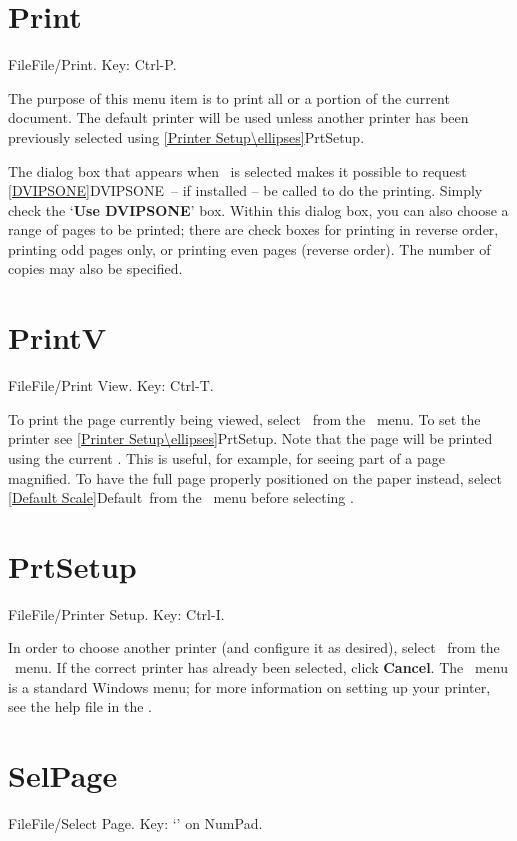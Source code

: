 \newpage
   
\section{Print}{File}File/Print. Key: Ctrl-P.

The purpose of this menu item is to print all or a portion of the
current document.   The default printer will be used unless another
printer has been previously selected using
\ref{Printer Setup\ellipses}{PrtSetup}.
   \bigskip

The dialog box that appears when \ is selected makes it
possible to request \ref{DVIPSONE}{DVIPSONE}\ -- if installed -- be called
to do the printing.  Simply check the `{\bf Use DVIPSONE}' box.  Within this
dialog box, you can also choose a range of pages to be printed; there are
check boxes for printing in reverse order, printing odd pages only, or
printing even pages (reverse order).  The number of copies may also be
specified. 
   \bigskip

\section{PrintV}{File}File/Print View. Key: Ctrl-T.

To print the page currently being viewed, select \ from
the \ menu.  To set the printer see \ref{Printer
Setup\ellipses}{PrtSetup}.  Note that the page will be printed using the
current .  This is useful, for example, for seeing part
of a page magnified.  To have the full page properly positioned on the
paper instead, select \ref{Default Scale}{Default}\ from the 
\ menu before selecting .

\newpage
   
\section{PrtSetup}{File}File/Printer Setup. Key: Ctrl-I.

In order to choose another printer (and configure it as desired), select
\ from the \ menu.  If the correct printer
has already been selected, click {\bf Cancel}. The \ 
menu is a standard Windows menu; for more information on setting up your
printer, see the help file in the 
.
   \bigskip

\section{SelPage}{File}File/Select Page\ellipses. Key: `\asterisk' on NumPad.

